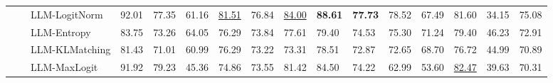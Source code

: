 \begin{table}[ht!]
\begin{tabularx}{\textwidth}{@{}l l l |l *{11}{Y}|Y@{}}
 &  & LLM-LogitNorm & 92.01 & 77.35 & 61.16 & \underline{81.51} & 76.84 & \underline{84.00} & \textbf{88.61} & \textbf{77.73} & 78.52 & 67.49 & 81.60 & 34.15 & 75.08 \\
 &  & LLM-Entropy & 83.75 & 73.26 & 64.05 & 76.29 & 73.84 & 77.61 & 79.40 & 74.53 & 75.30 & 71.24 & 79.40 & 46.23 & 72.91 \\
 &  & LLM-KLMatching & 81.43 & 71.01 & 60.99 & 76.29 & 73.22 & 73.31 & 78.51 & 72.87 & 72.65 & 68.70 & 76.72 & 44.99 & 70.89 \\
 &  & LLM-MaxLogit & 91.92 & 79.23 & 45.36 & 74.86 & 73.55 & 81.42 & 84.50 & 74.22 & 62.99 & 53.60 & \underline{82.47} & 39.63 & 70.31 \\
\bottomrule
\end{tabularx}
\label{table::openset_LCR0.5}
\end{table}